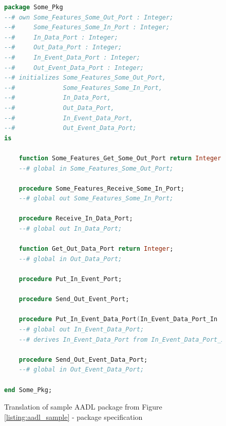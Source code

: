 \begin{figure}
\singlespacing
\begin{lstlisting}[language=ada, frame=single, gobble=0]
package Some_Pkg
--# own Some_Features_Some_Out_Port : Integer;
--#     Some_Features_Some_In_Port : Integer;
--#     In_Data_Port : Integer;
--#     Out_Data_Port : Integer;
--#     In_Event_Data_Port : Integer;
--#     Out_Event_Data_Port : Integer;
--# initializes Some_Features_Some_Out_Port,
--#             Some_Features_Some_In_Port,
--#             In_Data_Port,
--#             Out_Data_Port,
--#             In_Event_Data_Port,
--#             Out_Event_Data_Port;
is

    function Some_Features_Get_Some_Out_Port return Integer;
    --# global in Some_Features_Some_Out_Port;

    procedure Some_Features_Receive_Some_In_Port;
    --# global out Some_Features_Some_In_Port;

    procedure Receive_In_Data_Port;
    --# global out In_Data_Port;

    function Get_Out_Data_Port return Integer;
    --# global in Out_Data_Port;

    procedure Put_In_Event_Port;

    procedure Send_Out_Event_Port;

    procedure Put_In_Event_Data_Port(In_Event_Data_Port_In : Integer);
    --# global out In_Event_Data_Port;
    --# derives In_Event_Data_Port from In_Event_Data_Port_In;

    procedure Send_Out_Event_Data_Port;
    --# global in Out_Event_Data_Port;

end Some_Pkg;
\end{lstlisting}
\doublespacing
\caption{Translation of sample AADL package from Figure \ref{listing:aadl_sample} - package specification}
\label{listing:package_mapping_spec}
\end{figure}

